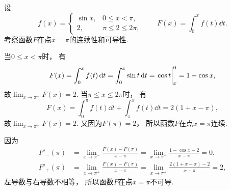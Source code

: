 \begin{example}%
设\begin{equation*}
	f(x) = \left\{ \begin{array}{cl}
		\sin x, & 0 \leq x < \pi, \\
		2, & \pi \leq 2 \leq 2\pi,
	\end{array} \right.
	\qquad
	F(x) = \int_0^x f(t) \dd{t}.
\end{equation*}
考察函数\(F\)在点\(x=\pi\)的连续性和可导性.
\begin{solution}
当\(0 \leq x < \pi\)时，
有\begin{equation*}
	F(x) = \int_0^x f(t) \dd{t}
	= \int_0^x \sin t \dd{t}
	= \eval{\cos t}_x^0
	= 1 - \cos x,
\end{equation*}
故\(\lim_{x\to\pi^-} F(x) = 2\).
当\(\pi \leq x \leq 2\pi\)时，
有\begin{equation*}
	F(x) = \int_0^\pi f(t) \dd{t} + \int_\pi^x f(t) \dd{t}
	= 2(1 + x - \pi),
\end{equation*}
故\(\lim_{x\to\pi^+} F(x) = 2\).
又因为\(F(\pi) = 2\)，
所以函数\(F\)在点\(x=\pi\)连续.

因为\begin{align*}
	F'_-(\pi)
	&= \lim_{x\to\pi^-} \frac{F(x) - F(\pi)}{x - \pi}
	= \lim_{x\to\pi^-} \frac{1 - \cos x - 2}{x - \pi}
	= 0, \\
	F'_+(\pi)
	&= \lim_{x\to\pi^+} \frac{F(x) - F(\pi)}{x - \pi}
	= \lim_{x\to\pi^+} \frac{2(1 + x - \pi) - 2}{x - \pi}
	= 2,
\end{align*}
左导数与右导数不相等，
所以函数\(F\)在点\(x=\pi\)不可导.
\end{solution}
\end{example}

